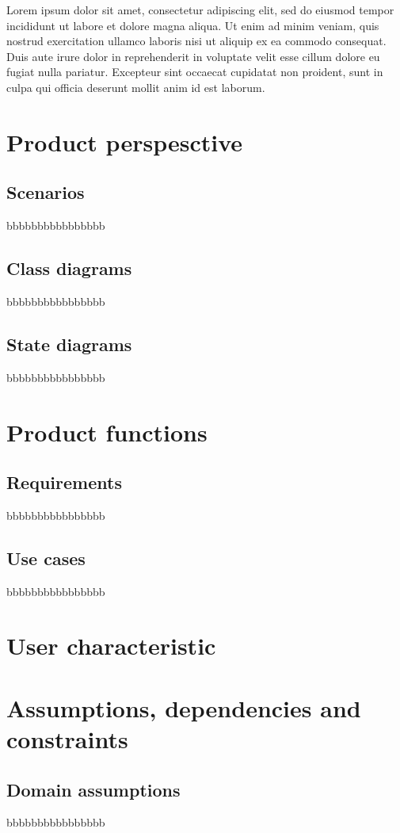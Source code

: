 Lorem ipsum dolor sit amet, consectetur adipiscing elit, sed do eiusmod tempor incididunt ut labore et dolore magna aliqua. Ut enim ad minim veniam, quis nostrud exercitation ullamco laboris nisi ut aliquip ex ea commodo consequat. Duis aute irure dolor in reprehenderit in voluptate velit esse cillum dolore eu fugiat nulla pariatur. Excepteur sint occaecat cupidatat non proident, sunt in culpa qui officia deserunt mollit anim id est laborum.

\newpage

\section{Product perspesctive}
\label{sec:product perspesctive}%

\subsection{Scenarios}
\label{subsec:scenarios}%
bbbbbbbbbbbbbbbb

\subsection{Class diagrams}
\label{subsec:class diagrams}%
bbbbbbbbbbbbbbbb

\subsection{State diagrams}
\label{subsec:state diagrams}%
bbbbbbbbbbbbbbbb

\section{Product functions}
\label{sec:scenarios}%

\subsection{Requirements}
\label{subsec:requirements}%
bbbbbbbbbbbbbbbb

\subsection{Use cases}
\label{subsec:use cases}%
bbbbbbbbbbbbbbbb

\section{User characteristic}
\label{sec:user characteristic}%

\section{Assumptions, dependencies and constraints}
\label{sec:scenarios}%

\subsection{Domain assumptions}
\label{subsec:domain assumptions}%
bbbbbbbbbbbbbbbb
